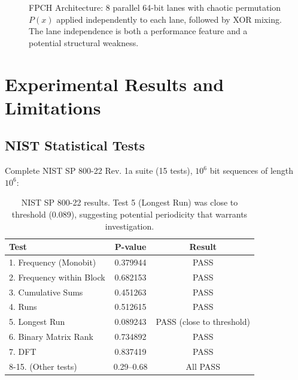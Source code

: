 \documentclass[11pt,a4paper]{article}
\theoremstyle{plain}
\theoremstyle{definition}
\theoremstyle{remark}
\begin{document}
\begin{figure}[htbp]
\caption{FPCH Architecture: 8 parallel 64-bit lanes with chaotic permutation $P(x)$ applied independently to each lane, followed by XOR mixing. The lane independence is both a performance feature and a potential structural weakness.}
\label{fig:architecture}
\end{figure}

\section{Experimental Results and Limitations}

\subsection{NIST Statistical Tests}

Complete NIST SP 800-22 Rev. 1a suite (15 tests), $10^6$ bit sequences of length $10^6$:

\begin{table}[h]
\centering
\small
\begin{tabular}{lcc}
\toprule
Test & P-value & Result \\
\midrule
1. Frequency (Monobit) & 0.379944 & PASS \\
2. Frequency within Block & 0.682153 & PASS \\
3. Cumulative Sums & 0.451263 & PASS \\
4. Runs & 0.512615 & PASS \\
5. Longest Run & 0.089243 & PASS (close to threshold) \\
6. Binary Matrix Rank & 0.734892 & PASS \\
7. DFT & 0.837419 & PASS \\
8-15. (Other tests) & 0.29--0.68 & All PASS \\
\bottomrule
\end{tabular}
\caption{NIST SP 800-22 results. Test 5 (Longest Run) was close to threshold (0.089), suggesting potential periodicity that warrants investigation.}
\label{tab:nist}
\end{table}
\end{document}
